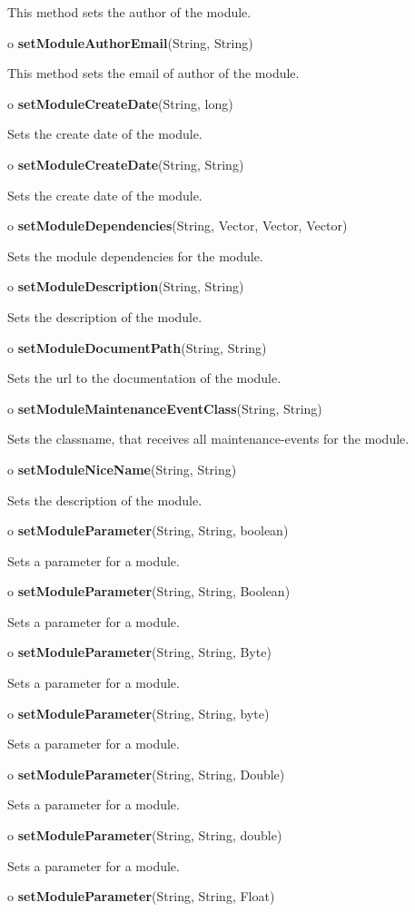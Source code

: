\begin{description}
This method sets the author of the module.  
\item o {\bf setModuleAuthorEmail}(String, String)  

This method sets the email of author of the module.  
\item o {\bf setModuleCreateDate}(String, long)  

Sets the create date of the module.  
\item o {\bf setModuleCreateDate}(String, String)  

Sets the create date of the module.  
\item o {\bf setModuleDependencies}(String, Vector, Vector, Vector)  

Sets the module dependencies for the module.  
\item o {\bf setModuleDescription}(String, String)  

Sets the description of the module.  
\item o {\bf setModuleDocumentPath}(String, String)  

Sets the url to the documentation of the module.  
\item o {\bf setModuleMaintenanceEventClass}(String, String)  

Sets the classname, that receives all maintenance-events for the module.  
\item o {\bf setModuleNiceName}(String, String)  

Sets the description of the module.  
\item o {\bf setModuleParameter}(String, String, boolean)  

Sets a parameter for a module.  
\item o {\bf setModuleParameter}(String, String, Boolean)  

Sets a parameter for a module.  
\item o {\bf setModuleParameter}(String, String, Byte)  

Sets a parameter for a module.  
\item o {\bf setModuleParameter}(String, String, byte)  

Sets a parameter for a module.  
\item o {\bf setModuleParameter}(String, String, Double)  

Sets a parameter for a module.  
\item o {\bf setModuleParameter}(String, String, double)  

Sets a parameter for a module.  
\item o {\bf setModuleParameter}(String, String, Float)  


\end{description}
